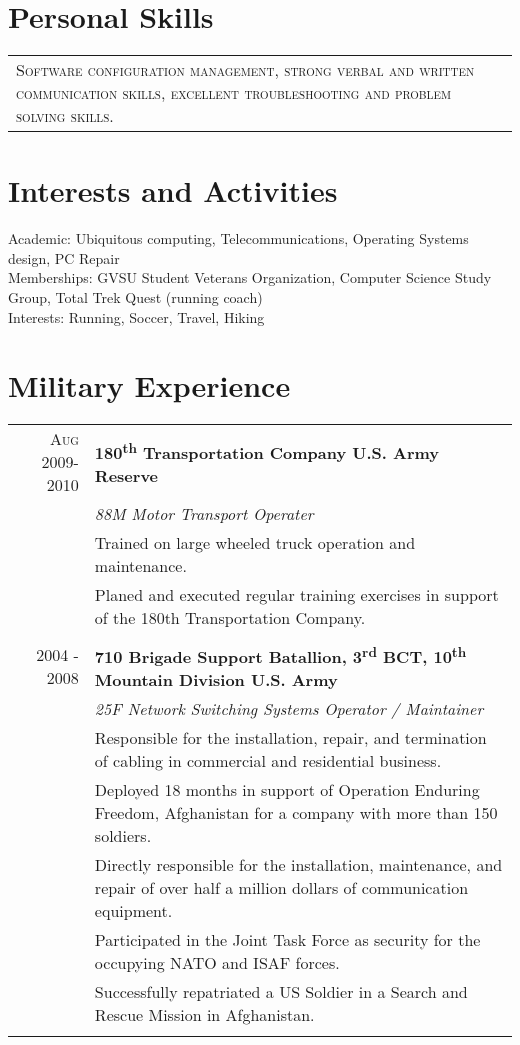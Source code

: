 \documentclass[a4paper,10pt]{article}
\begin{document}
\section{Personal Skills}
 \begin{tabular}{p{15.5cm}}
 \textsc{Software configuration management, strong verbal and written communication skills, excellent troubleshooting and problem solving skills.}
\end{tabular}

\section{Interests and Activities}
Academic: Ubiquitous computing, Telecommunications, Operating Systems design, PC Repair\\
Memberships: GVSU Student Veterans Organization, Computer Science Study Group, Total Trek Quest (running coach)\\
Interests: Running, Soccer, Travel, Hiking

\section{Military Experience}
\begin{tabular}{r|p{15.5cm}}
 \textsc{Aug 2009-2010} & \textbf{180\textsuperscript{th} Transportation Company \hfill U.S. Army Reserve } \\&\emph{88M Motor Transport Operater}\\&\small{Trained on large wheeled truck operation and maintenance.}
 \\&\small{Planed and executed regular training exercises in support of the 180th Transportation Company.}
 \\\multicolumn{2}{c}{} \\

\textsc{2004 - 2008} & \textbf{710 Brigade Support Batallion, 3\textsuperscript{rd} BCT, 10\textsuperscript{th} Mountain Division \hfill U.S. Army }\\&\emph{25F Network Switching Systems Operator / Maintainer} \\&\small{ Responsible for the installation, repair, and termination of cabling in commercial and residential business.}
\\&\small{Deployed 18 months in support of Operation Enduring Freedom, Afghanistan for a company with more than 150 soldiers.}
\\&\small{Directly responsible for the installation, maintenance, and repair of over half a million dollars of communication equipment.}
\\&\small{Participated in the Joint Task Force as security for the occupying NATO and ISAF forces.}
\\&\small{Successfully repatriated a US Soldier in a Search and Rescue Mission in Afghanistan.}
 \\\multicolumn{2}{c}{} \\
\end{tabular}
\end{document}
